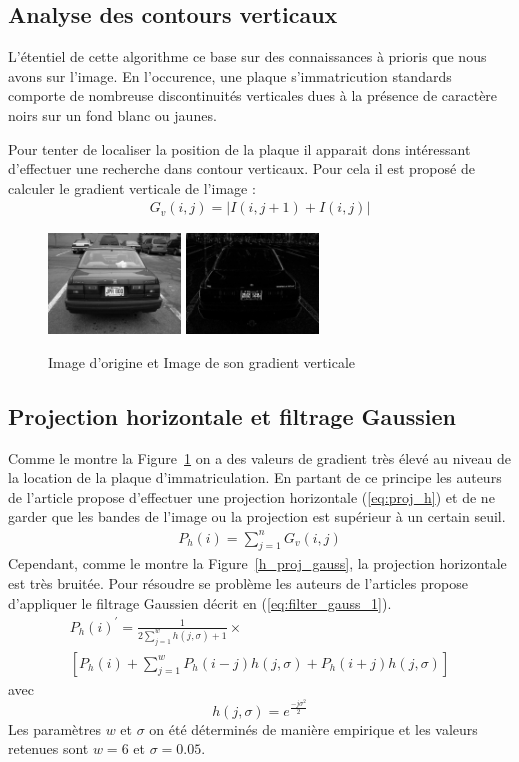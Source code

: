 \documentclass[a4paper,10pt,twocolumn]{article}
\begin{document}
\subsection{Analyse des contours verticaux}
L'étentiel de cette algorithme ce base sur des connaissances à prioris que nous avons sur l'image. En l'occurence, une plaque s'immatricution standards comporte de nombreuse discontinuités verticales dues à la présence de caractère noirs sur un fond blanc ou jaunes.

Pour tenter de localiser la position de la plaque il apparait dons intéressant d'effectuer une recherche dans contour verticaux. Pour cela il est proposé de calculer le gradient verticale de l'image :
\begin{align}
  G_v(i, j) = |I(i, j + 1) + I(i, j)|
\end{align}
\begin{figure}[H]
	\centering 
	  \includegraphics[width=100pt]{img/991213-006.png}
	  \includegraphics[width=100pt]{img/991213-006_grad.png}
	\caption{Image d'origine et Image de son gradient verticale\label{grad}}
\end{figure}

\subsection{Projection horizontale et filtrage Gaussien}
Comme le montre la Figure~\ref{grad} on a des valeurs de gradient très élevé au niveau de la location de la plaque d'immatriculation. En partant de ce principe les auteurs de l'article propose d'effectuer une projection horizontale (\ref{eq:proj_h}) et de ne garder que les bandes de l'image ou la projection est supérieur à un certain seuil.
\begin{align} \label{eq:proj_h}
  P_h(i) = \sum_{j=1}^{n}G_v(i, j)
\end{align}
Cependant, comme le montre la Figure~\ref{h_proj_gauss}, la projection horizontale est très bruitée. Pour résoudre se problème les auteurs de l'articles propose d'appliquer le filtrage Gaussien décrit en (\ref{eq:filter_gauss_1}).
\begin{gather} \label{eq:filter_gauss_1}
  P_h(i)^{\prime} = \frac{1}{2 \sum_{j = 1}^{w} h(j, \sigma) + 1} \times\\ 
  \left[ P_h(i) + \sum_{j = 1}^{w} P_h(i - j)h(j, \sigma) + P_h(i + j)h(j, \sigma) \right]\nonumber
\end{gather}
avec 
\[ h(j, \sigma) = e^{\frac{-j\sigma^2}{2}} \]
Les paramètres $w$ et $\sigma$ on été déterminés de manière empirique et les valeurs retenues sont $w = 6$ et $\sigma = 0.05$.
\end{document}
